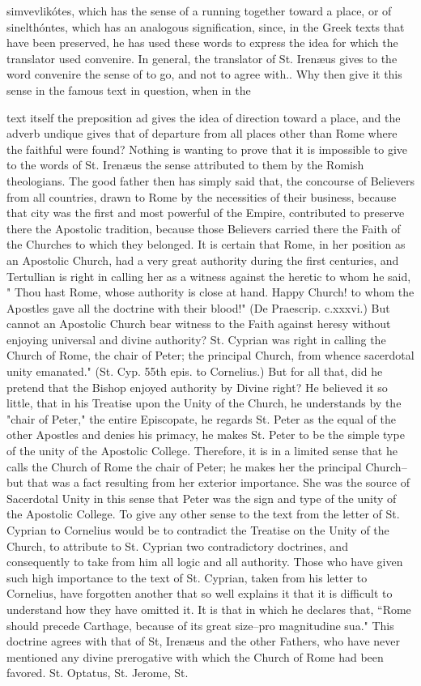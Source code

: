 simvevlikótes, which has the sense of a running together toward a place, or of sinelthóntes, which has an analogous signification, since, in the Greek texts that have been preserved, he has used these words to express the idea for which the translator used convenire. In general, the translator of St. Irenæus gives to the word convenire the sense of to go, and not to agree with.. Why then give it this sense in the famous text in question, when in the

text itself the preposition ad gives the idea of direction toward a place, and the adverb undique gives that of departure from all places other than Rome where the faithful were found? Nothing is wanting to prove that it is impossible to give to the words of St. Irenæus the sense attributed to them by the Romish theologians. The good father then has simply said that, the concourse of Believers from all countries, drawn to Rome by the necessities of their business, because that city was the first and most powerful of the Empire, contributed to preserve there the Apostolic tradition, because those Believers carried there the Faith of the Churches to which they belonged. It is certain that Rome, in her position as an Apostolic Church, had a very great authority during the first centuries, and Tertullian is right in calling her as a witness against the heretic to whom he said, " Thou hast Rome, whose authority is close at hand. Happy Church! to whom the Apostles gave all the doctrine with their blood!" (De Praescrip. c.xxxvi.) But cannot an Apostolic Church bear witness to the Faith against heresy without enjoying universal and divine authority? St. Cyprian was right in calling the Church of Rome, the chair of Peter; the principal Church, from whence sacerdotal unity emanated." (St. Cyp. 55th epis. to Cornelius.) But for all that, did he pretend that the Bishop enjoyed authority by Divine right? He believed it so little, that in his Treatise upon the Unity of the Church, he understands by the "chair of Peter," the entire Episcopate, he regards St. Peter as the equal of the other Apostles and denies his primacy, he makes St. Peter to be the simple type of the unity of the Apostolic College. Therefore, it is in a limited sense that he calls the Church of Rome the chair of Peter; he makes her the principal Church--but that was a fact resulting from her exterior importance. She was the source of Sacerdotal Unity in this sense that Peter was the sign and type of the unity of the Apostolic College. To give any other sense to the text from the letter of St. Cyprian to Cornelius would be to contradict the Treatise on the Unity of the Church, to attribute to St. Cyprian two contradictory doctrines, and consequently to take from him all logic and all authority. Those who have given such high importance to the text of St. Cyprian, taken from his letter to Cornelius, have forgotten another that so well explains it that it is difficult to understand how they have omitted it. It is that in which he declares that, “Rome should precede Carthage, because of its great size--pro magnitudine sua." This doctrine agrees with that of St, Irenæus and the other Fathers, who have never mentioned any divine prerogative with which the Church of Rome had been favored. St. Optatus, St. Jerome, St. 